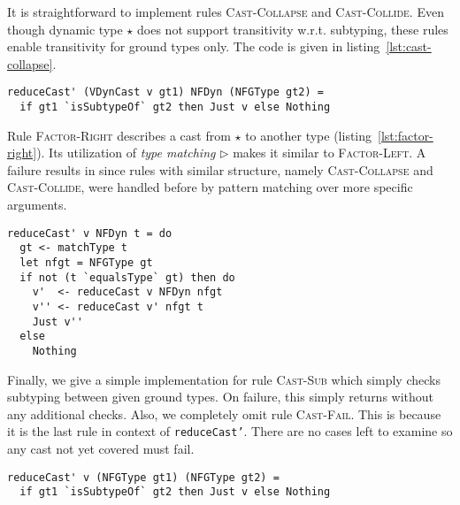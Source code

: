It is straightforward to implement rules \textsc{Cast-Collapse} and \textsc{Cast-Collide}. Even though dynamic type $\star$ does not support transitivity w.r.t. subtyping, these rules enable transitivity for ground types only. The code is given in listing~\ref{lst:cast-collapse}.

\begin{lstlisting}[float,
  caption=Haskell: Rules \textsc{Cast-Collapse} and \\ \textsc{Cast-Collide} (\texttt{Interpreter.hs}),
  label=lst:cast-collapse]
reduceCast' (VDynCast v gt1) NFDyn (NFGType gt2) =
  if gt1 `isSubtypeOf` gt2 then Just v else Nothing
\end{lstlisting}

Rule \textsc{Factor-Right} describes a cast from $\star$ to another type (listing~\ref{lst:factor-right}). Its utilization of \emph{type matching} $\rhd$ makes it similar to \textsc{Factor-Left}. A failure results in \blame since rules with similar structure, namely \textsc{Cast-Collapse} and \textsc{Cast-Collide}, were handled before by pattern matching over more specific arguments.

\begin{lstlisting}[float,
  caption=Haskell: Rule \textsc{Factor-Right} (\texttt{Interpreter.hs}),
  label=lst:factor-right]
reduceCast' v NFDyn t = do
  gt <- matchType t
  let nfgt = NFGType gt
  if not (t `equalsType` gt) then do
    v'  <- reduceCast v NFDyn nfgt
    v'' <- reduceCast v' nfgt t
    Just v''
  else
    Nothing
\end{lstlisting}

Finally, we give a simple implementation for rule \textsc{Cast-Sub} which simply checks subtyping between given ground types. On failure, this simply returns \blame without any additional checks. Also, we completely omit rule \textsc{Cast-Fail}. This is because it is the last rule in context of \texttt{reduceCast'}. There are no cases left to examine so any cast not yet covered must fail.

\begin{lstlisting}[caption=Haskell: Rule \textsc{Cast-Sub} (\texttt{Interpreter.hs})]
reduceCast' v (NFGType gt1) (NFGType gt2) =
  if gt1 `isSubtypeOf` gt2 then Just v else Nothing
\end{lstlisting}

